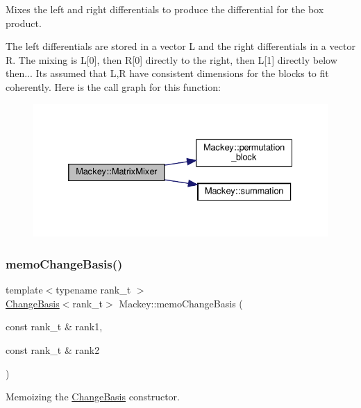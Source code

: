 Mixes the left and right differentials to produce the differential for the box product. 

The left differentials are stored in a vector L and the right differentials in a vector R. The mixing is L\mbox{[}0\mbox{]}, then R\mbox{[}0\mbox{]} directly to the right, then L\mbox{[}1\mbox{]} directly below then... It\textquotesingle{}s assumed that L,R have consistent dimensions for the blocks to fit coherently. Here is the call graph for this function\+:\nopagebreak
\begin{figure}[H]
\begin{center}
\leavevmode
\includegraphics[width=332pt]{namespaceMackey_a993f40280c4b6eae358e8c1bb4daa290_cgraph}
\end{center}
\end{figure}
\mbox{\label{namespaceMackey_a70952d513d08b47bc282441a3e9d732c}} 
\subsubsection{\texorpdfstring{memo\+Change\+Basis()}{memoChangeBasis()}}
{\footnotesize\ttfamily template$<$typename rank\+\_\+t $>$ \\
\hyperlink{classMackey_1_1ChangeBasis}{Change\+Basis}$<$rank\+\_\+t$>$ Mackey\+::memo\+Change\+Basis (\begin{DoxyParamCaption}\item[{const rank\+\_\+t \&}]{rank1,  }\item[{const rank\+\_\+t \&}]{rank2 }\end{DoxyParamCaption})}



Memoizing the \hyperlink{classMackey_1_1ChangeBasis}{Change\+Basis} constructor. 

